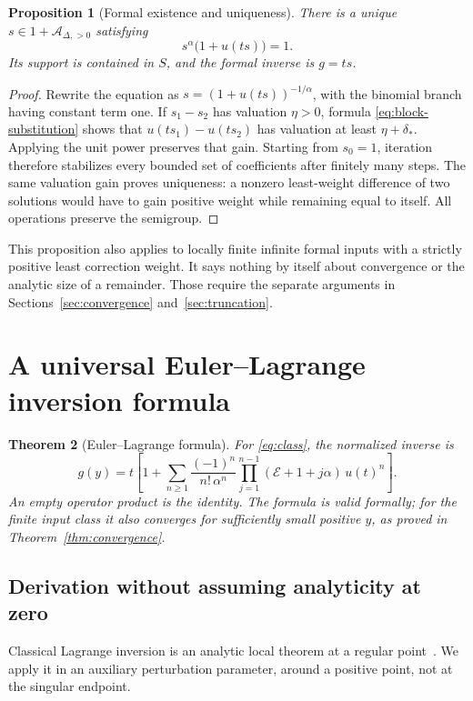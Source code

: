 \documentclass[11pt,a4paper]{article}
\numberwithin{equation}{section}
\newtheorem{theorem}{Theorem}[section]
\newtheorem{proposition}[theorem]{Proposition}
\theoremstyle{definition}\newtheorem{definition}[theorem]{Definition}
\theoremstyle{remark}\newtheorem{remark}[theorem]{Remark}
\newcommand{\Eul}{\mathcal E}
\begin{document}
\begin{proposition}[Formal existence and uniqueness]\label{prop:formal}
There is a unique \(s\in1+\mathcal A_{\Delta,>0}\) satisfying
\begin{equation}\label{eq:normalized-inverse}
 s^\alpha\bigl(1+u(ts)\bigr)=1.
\end{equation}
Its support is contained in \(S\), and the formal inverse is \(g=t s\).
\end{proposition}
\begin{proof}
Rewrite the equation as
\(s=(1+u(ts))^{-1/\alpha}\), with the binomial branch having constant term
one. If \(s_1-s_2\) has valuation \(\eta>0\), formula
\eqref{eq:block-substitution} shows that
\(u(ts_1)-u(ts_2)\) has valuation at least \(\eta+\delta_*\).
Applying the unit power preserves that gain. Starting from \(s_0=1\),
iteration therefore stabilizes every bounded set of coefficients after
finitely many steps. The same valuation gain proves uniqueness: a nonzero
least-weight difference of two solutions would have to gain positive weight
while remaining equal to itself. All operations preserve the semigroup.
\end{proof}

This proposition also applies to locally finite infinite formal inputs
with a strictly positive least correction weight. It says nothing by itself
about convergence or the analytic size of a remainder. Those require the
separate arguments in Sections~\ref{sec:convergence} and~\ref{sec:truncation}.

\section{A universal Euler--Lagrange inversion formula}
\label{sec:formula}

\begin{theorem}[Euler--Lagrange formula]\label{thm:euler}
For \eqref{eq:class}, the normalized inverse is
\begin{equation}\label{eq:master}
 \boxed{\displaystyle
 g(y)=t\left[1+\sum_{n\ge1}
 \frac{(-1)^n}{n!\,\alpha^n}
 \prod_{j=1}^{n-1}(\Eul+1+j\alpha)\,u(t)^n\right].}
\end{equation}
An empty operator product is the identity. The formula is valid formally;
for the finite input class it also converges for sufficiently small positive
\(y\), as proved in Theorem~\ref{thm:convergence}.
\end{theorem}

\subsection{Derivation without assuming analyticity at zero}
Classical Lagrange inversion is an analytic local theorem at a regular
point~\cite{dlmf}. We apply it in an auxiliary perturbation parameter, around
a positive point, not at the singular endpoint.
\end{document}
